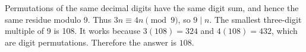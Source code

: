 Permutations of the same decimal digits have the same digit sum, and hence the same residue modulo 9. Thus $3n\equiv4n\pmod9$, so $9\mid n$. The smallest three-digit multiple of 9 is 108. It works because $3(108)=324$ and $4(108)=432$, which are digit permutations. Therefore the answer is $\boxed{108}$.
